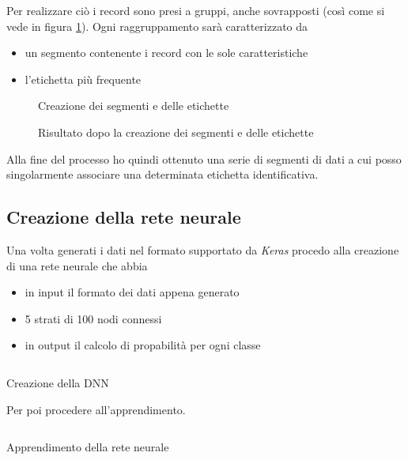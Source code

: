 Per realizzare ciò i record sono presi a gruppi, anche sovrapposti (così come si vede in figura \ref{fig:create_segments_and_labels}). 
Ogni raggruppamento sarà caratterizzato da 
\begin{itemize}
    \item un segmento contenente i record con le sole caratteristiche
    \item l'etichetta più frequente
\end{itemize}

\begin{figure}[H]
  \centering
  
  \caption{Creazione dei segmenti e delle etichette}
  \label{fig:create_segments_and_labels}
\end{figure}

\begin{figure}[H]
  \centering
  
  \caption{Risultato dopo la creazione dei segmenti e delle etichette}
  \label{fig:segments_and_labels}
\end{figure}

Alla fine del processo ho quindi ottenuto una serie di segmenti di dati a cui posso singolarmente associare una determinata
etichetta identificativa.

\newpage
\subsection{Creazione della rete neurale}
Una volta generati i dati nel formato supportato da \textit{Keras} procedo alla creazione di 
una rete neurale che abbia
\begin{itemize}
    \item in input il formato dei dati appena generato
    \item 5 strati di 100 nodi connessi
    \item in output il calcolo di propabilità per ogni classe
\end{itemize}
\begin{listing}[H] 
    \inputminted[frame=single,framesep=10pt]{python}{snippets/dnn_create.py}
    \caption{Creazione della DNN}
\end{listing}
Per poi procedere all'apprendimento.
\begin{listing}[H] 
    \inputminted[frame=single,framesep=10pt]{python}{snippets/dnn_fit.py}
    \caption{Apprendimento della rete neurale}
\end{listing}

